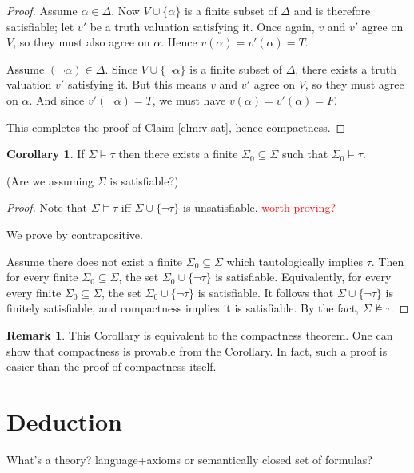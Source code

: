 \documentclass[12pt]{article}
\theoremstyle{definition}
\newtheorem{corollary}[theorem]{Corollary}
\newtheorem{remark}[theorem]{Remark}
\newcommand{\<}{\langle}
\renewcommand{\>}{\rangle}
\newcommand{\seq}{\subseteq}
\begin{document}
\begin{proof}

    Assume $\alpha \in \Delta$.
    Now $V \cup \{\alpha\}$ is a finite subset of $\Delta$ and is therefore satisfiable; let $v'$ be a truth valuation satisfying it.
    Once again, $v$ and $v'$ agree on $V$, so they must also agree on $\alpha$.
    Hence $v(\alpha) = v'(\alpha) = T$.

    Assume $(\lnot\alpha) \in \Delta$.
    Since $V \cup \{\lnot\alpha\}$ is a finite subset of $\Delta$, there exists a truth valuation $v'$ satisfying it.
    But this means $v$ and $v'$ agree on $V$, so they must agree on $\alpha$.
    And since $v'(\lnot\alpha) = T$, we must have $v(\alpha) = v'(\alpha) = F$.

    This completes the proof of Claim \ref{clm:v-sat}, hence compactness.
\end{proof}


\begin{corollary}
    If $\Sigma \vDash \tau$ then there exists a finite $\Sigma_0 \seq \Sigma$ such that $\Sigma_0 \vDash \tau$.
\end{corollary}

(Are we assuming $\Sigma$ is satisfiable?)

\begin{proof}
    Note that $\Sigma \vDash \tau$ iff $\Sigma \cup \{\lnot\tau\}$ is unsatisfiable.
    \textcolor{red}{worth proving?}

    We prove by contrapositive.

    Assume there does not exist a finite $\Sigma_0 \seq \Sigma$ which tautologically implies $\tau$.
    Then for every finite $\Sigma_0 \seq \Sigma$, the set $\Sigma_0 \cup \{\lnot\tau\}$ is satisfiable.
    Equivalently, for every every finite $\Sigma_0 \seq \Sigma$, the set $\Sigma_0 \cup \{\lnot\tau\}$ is satisfiable.
    It follows that $\Sigma \cup \{\lnot\tau\}$ is finitely satisfiable, and compactness implies it is satisfiable.
    By the fact, $\Sigma \nvDash \tau$.
\end{proof}

\begin{remark}
    This Corollary is equivalent to the compactness theorem.
    One can show that compactness is provable from the Corollary.
    In fact, such a proof is easier than the proof of compactness itself.
\end{remark}

\section{Deduction}

What's a theory? language+axioms or semantically closed set of formulas?
\end{document}

